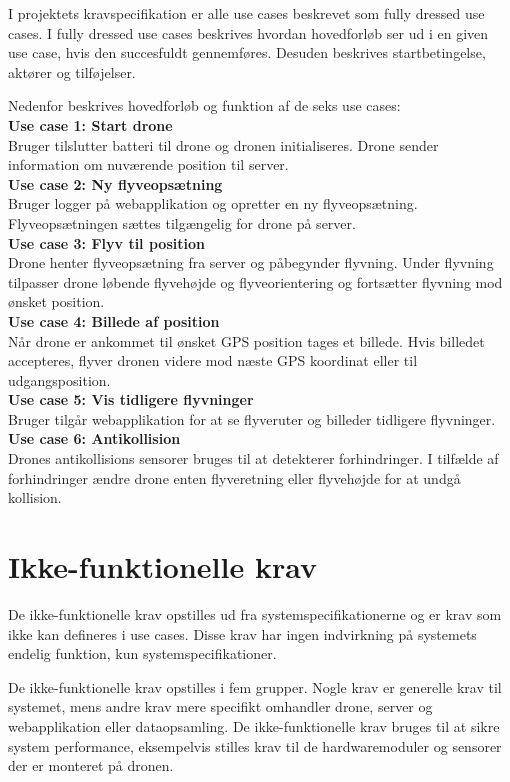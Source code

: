 \newpage

I projektets kravspecifikation er alle use cases beskrevet som fully dressed use cases. I fully dressed use cases beskrives hvordan hovedforløb ser ud i en given use case, hvis den succesfuldt gennemføres. Desuden beskrives startbetingelse, aktører og tilføjelser.

Nedenfor beskrives hovedforløb og funktion af de seks use cases:\\

\textbf{Use case 1: Start drone} \\
Bruger tilslutter batteri til drone og dronen initialiseres. Drone sender information om nuværende position til server.\\

\textbf{Use case 2: Ny flyveopsætning} \\
Bruger logger på webapplikation og opretter en ny flyveopsætning. Flyveopsætningen sættes tilgængelig for drone på server.\\

\textbf{Use case 3: Flyv til position}\\
Drone henter flyveopsætning fra server og påbegynder flyvning. Under flyvning tilpasser drone  løbende flyvehøjde og flyveorientering og fortsætter flyvning mod ønsket position. \\

\textbf{Use case 4: Billede af position} \\
Når drone er ankommet til ønsket GPS position tages et billede. Hvis billedet accepteres, flyver dronen videre mod næste GPS koordinat eller til udgangsposition. \\

\textbf{Use case 5: Vis tidligere flyvninger} \\
Bruger tilgår webapplikation for at se flyveruter og billeder tidligere flyvninger.\\

\textbf{Use case 6: Antikollision} \\
Drones antikollisions sensorer bruges til at detekterer forhindringer. I tilfælde af forhindringer ændre drone enten flyveretning eller flyvehøjde for at undgå kollision. \\



\section{Ikke-funktionelle krav}

De ikke-funktionelle krav opstilles ud fra systemspecifikationerne og er krav som ikke kan defineres i use cases. Disse krav har ingen indvirkning på systemets endelig funktion, kun systemspecifikationer.  

De ikke-funktionelle krav opstilles i fem grupper. Nogle krav er generelle krav til systemet, mens andre krav mere specifikt omhandler drone, server og webapplikation eller dataopsamling. 
De ikke-funktionelle krav bruges til at sikre system performance, eksempelvis stilles krav til de hardwaremoduler og sensorer der er monteret på dronen. 
